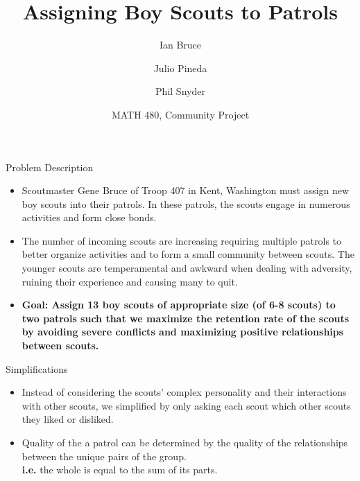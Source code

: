 \documentclass{beamer}
\title{Assigning Boy Scouts to Patrols}
\author{Ian Bruce \and Julio Pineda \and Phil Snyder}
\date{MATH 480, Community Project}
\begin{document}
\begin{frame}
  \titlepage
\end{frame}

\begin{frame}{Problem Description}%
	\begin{itemize}
		\item Scoutmaster Gene Bruce of Troop 407 in Kent, Washington must assign new boy scouts into their patrols. In these patrols, the scouts engage in numerous activities and form close bonds. \\
		\vspace{0.2in}
		\item The number of incoming scouts are increasing requiring multiple patrols to better organize activities and to form a small community between scouts.
		The younger scouts are temperamental and awkward when dealing with adversity, ruining their experience and causing many to quit. \\
		\vspace{0.2in}
		\item \textbf{Goal:  Assign 13 boy scouts of appropriate size (of 6-8 scouts) to two patrols such that we maximize the retention rate of the scouts by avoiding severe conflicts and maximizing positive relationships between scouts.}
	\end{itemize}
\end{frame}

\begin{frame}{Simplifications}
	\begin{itemize}
		\item Instead of considering the scouts' complex personality and their interactions with other scouts, we simplified by only asking each scout which other scouts they liked or disliked.
		\vspace{0.5in}
		\item Quality of the a patrol can be determined by the quality of the relationships between the unique pairs of the group. \\
		\textbf{i.e.} the whole is equal to the sum of its parts.
	\end{itemize}
\end{frame}
\end{document}
